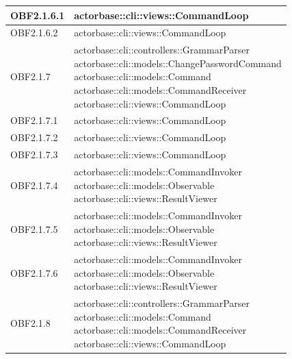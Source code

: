 \documentclass{scalatekids-article}
\begin{document}
\begin{longtable}[H]{|p{5cm}|p{12cm}|}
\hline
OBF2.1.6.1 & \multiLineCell[t]{actorbase::cli::views::CommandLoop\\}\\
\hline
OBF2.1.6.2 & \multiLineCell[t]{actorbase::cli::views::CommandLoop\\}\\
\hline
OBF2.1.7 & \multiLineCell[t]{actorbase::cli::controllers::GrammarParser\\actorbase::cli::models::ChangePasswordCommand\\actorbase::cli::models::Command\\actorbase::cli::models::CommandReceiver\\actorbase::cli::views::CommandLoop\\}\\
\hline
OBF2.1.7.1 & \multiLineCell[t]{actorbase::cli::views::CommandLoop\\}\\
\hline
OBF2.1.7.2 & \multiLineCell[t]{actorbase::cli::views::CommandLoop\\}\\
\hline
OBF2.1.7.3 & \multiLineCell[t]{actorbase::cli::views::CommandLoop\\}\\
\hline
OBF2.1.7.4 & \multiLineCell[t]{actorbase::cli::models::CommandInvoker\\actorbase::cli::models::Observable\\actorbase::cli::views::ResultViewer\\}\\
\hline
OBF2.1.7.5 & \multiLineCell[t]{actorbase::cli::models::CommandInvoker\\actorbase::cli::models::Observable\\actorbase::cli::views::ResultViewer\\}\\
\hline
OBF2.1.7.6 & \multiLineCell[t]{actorbase::cli::models::CommandInvoker\\actorbase::cli::models::Observable\\actorbase::cli::views::ResultViewer\\}\\
\hline
OBF2.1.8 & \multiLineCell[t]{actorbase::cli::controllers::GrammarParser\\actorbase::cli::models::Command\\actorbase::cli::models::CommandReceiver\\actorbase::cli::views::CommandLoop\\}\\

\end{longtable}
\end{document}
